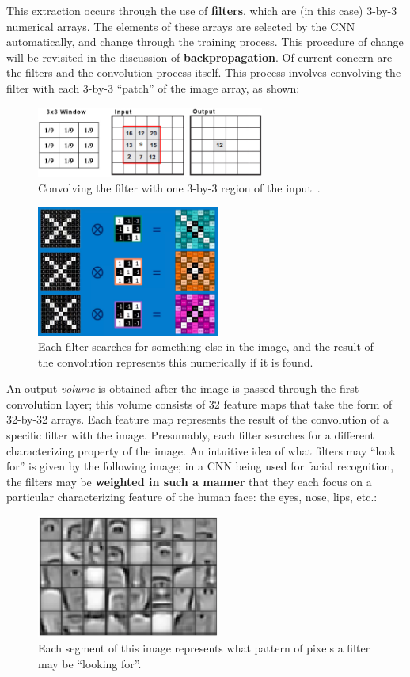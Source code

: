 \documentclass[a4paper, 11pt]{article} %
\begin{document}
 		This extraction occurs through the use of \textbf{filters}, which are (in this case) 3-by-3
 		numerical arrays. The elements of these arrays are selected by the CNN automatically, and 
 		change through the training process. This procedure of change will be revisited in the discussion 
 		of \textbf{backpropagation}. Of current concern are the filters and the convolution process itself. 
 		This process involves convolving the filter with each 3-by-3 ``patch'' of the image array, as 
 		shown:
 		\begin{figure}[h]
 			\centering
 			\includegraphics[width=7.5cm]{figures/filter_convol.jpg}
 			\caption{Convolving the filter with one 3-by-3 region of the input~\cite{convol-filter}\relax.}
 		\end{figure}
 		\begin{figure}[h]
 		\centering
 		\includegraphics[width=6cm]{figures/output_vol.png}
 		\caption{Each filter searches for something else in the image, and the result of the convolution 
 			represents this numerically if it is found.}
 		\end{figure}
 		\newpage
 		An output \textit{volume} is obtained after the image is passed through the first convolution 
 		layer; this volume consists of 32 feature maps that take the form of 32-by-32 arrays. Each 
 		feature 
 		map represents the result of the convolution of a specific filter with the image. Presumably, each 
 		filter searches for a different characterizing property of the image. An intuitive idea of what filters 
 		may ``look for'' is given by the following image; in a CNN being used for facial recognition, the 
 		filters may be \textbf{weighted in such a manner} that they each focus on a particular 
 		characterizing feature of the human face: the eyes, nose, lips, etc.: 
 		\vskip 5mm
 		\begin{figure}[h]
 			\centering
 			\includegraphics[width=6cm]{figures/filter_int.png}
 			\caption{Each segment of this image represents what pattern of pixels a filter may be ``looking 
 			for''.}
 		\end{figure}
	
\end{document}
